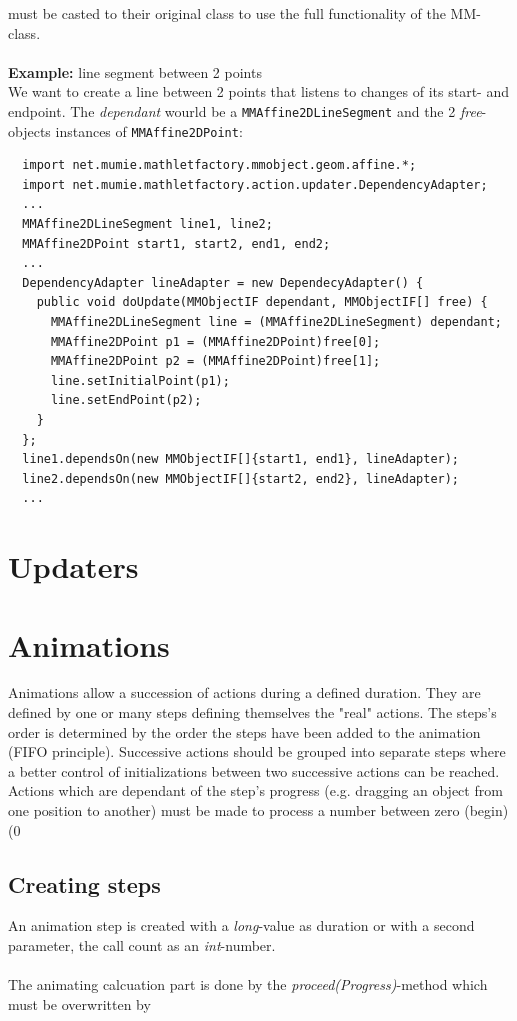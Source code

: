 \documentclass[a4paper,12pt]{book}
\begin{document}
  must be casted to their original class to use the full functionality of the
  MM-class.
  \\\\
  {\bf Example:} line segment between 2 points\\
  We want to create a line between 2 points that listens to changes of its start- and endpoint.
  The \textit{dependant} wourld be a \verb|MMAffine2DLineSegment| and the 2 \textit{free}-objects
  instances of \verb|MMAffine2DPoint|:\\
  {\small\ttfamily
  \begin{verbatim}
  import net.mumie.mathletfactory.mmobject.geom.affine.*;
  import net.mumie.mathletfactory.action.updater.DependencyAdapter;
  ...
  MMAffine2DLineSegment line1, line2;
  MMAffine2DPoint start1, start2, end1, end2;
  ...
  DependencyAdapter lineAdapter = new DependecyAdapter() {
    public void doUpdate(MMObjectIF dependant, MMObjectIF[] free) {
      MMAffine2DLineSegment line = (MMAffine2DLineSegment) dependant;
      MMAffine2DPoint p1 = (MMAffine2DPoint)free[0];
      MMAffine2DPoint p2 = (MMAffine2DPoint)free[1];
      line.setInitialPoint(p1);
      line.setEndPoint(p2);
    }
  };
  line1.dependsOn(new MMObjectIF[]{start1, end1}, lineAdapter);
  line2.dependsOn(new MMObjectIF[]{start2, end2}, lineAdapter);
  ...
  \end{verbatim}
  }
  
  \section{Updaters}
  
  \section{Animations}
    Animations allow a succession of actions during a defined duration.
    They are defined by one or many steps defining themselves the "real"
    actions. The steps's order is determined by the order the steps have been added
    to the animation (FIFO principle).
    Successive actions should be grouped into separate steps where a better control
    of initializations between two successive actions can be reached.
    Actions which are dependant of the step's progress (e.g. dragging an object
    from one position to another) must be made to process a number between zero
    (begin)(0%
    
    \subsection{Creating steps}
    An animation step is created with a \textit{long}-value as duration or with a
    second parameter, the call count as an \textit{int}-number.
    \\\\
    The animating calcuation part is done by the \textit{proceed(Progress)}-method which
    must be overwritten by 
    
\end{document}

